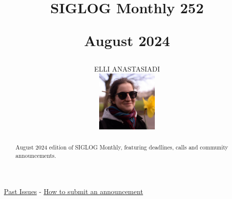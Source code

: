 \documentclass[prodmode,acmtecs]{acmsmall} %
\newcounter{colstart}
\begin{document}
\setcounter{colstart}{\thepage}

\title{{\huge\sc SIGLOG Monthly 252}

 August 2024}\author{ELLI ANASTASIADI\vspace*{-2.6cm}\begin{flushright}\includegraphics[width=30mm]{elli_anastasiadi.png}\end{flushright}}\begin{abstract}August 2024 edition of SIGLOG Monthly, featuring deadlines, calls and community announcements.
\end{abstract}


\maketitlee

\href{https://lics.siglog.org/newsletters/}{Past Issues}
 - 
\href{https://lics.siglog.org/newsletters/inst.html}{How to submit an announcement}
\end{document}

